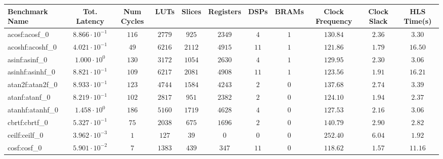 \begin{tabular}{|l|c|c|c|c|c|c|c|c|c|c|}
\hline
Benchmark Name               & Tot. Latency            & Num Cycles & LUTs       & Slices    & Registers & DSPs    & BRAMs & Clock Frequency & Clock Slack & HLS Time(s) \\
\hline
acosf:acosf\_0               & $ 8.866 \cdot 10^{-1} $ & $ 116    $ & $ 2779   $ & $ 925   $ & $ 2349  $ & $ 4   $ & $ 1 $ & $ 130.84      $ & $ 2.36    $ & $ 3.30    $ \\
acoshf:acoshf\_0             & $ 4.021 \cdot 10^{-1} $ & $ 49     $ & $ 6216   $ & $ 2112  $ & $ 4915  $ & $ 11  $ & $ 1 $ & $ 121.86      $ & $ 1.79    $ & $ 16.50   $ \\
asinf:asinf\_0               & $ 1.000 \cdot 10^{0}  $ & $ 130    $ & $ 3172   $ & $ 1054  $ & $ 2630  $ & $ 4   $ & $ 1 $ & $ 129.95      $ & $ 2.30    $ & $ 3.06    $ \\
asinhf:asinhf\_0             & $ 8.821 \cdot 10^{-1} $ & $ 109    $ & $ 6217   $ & $ 2081  $ & $ 4908  $ & $ 11  $ & $ 1 $ & $ 123.56      $ & $ 1.91    $ & $ 16.21   $ \\
atan2f:atan2f\_0             & $ 8.933 \cdot 10^{-1} $ & $ 123    $ & $ 4744   $ & $ 1584  $ & $ 4243  $ & $ 2   $ & $ 0 $ & $ 137.68      $ & $ 2.74    $ & $ 3.39    $ \\
atanf:atanf\_0               & $ 8.219 \cdot 10^{-1} $ & $ 102    $ & $ 2817   $ & $ 951   $ & $ 2382  $ & $ 2   $ & $ 0 $ & $ 124.10      $ & $ 1.94    $ & $ 2.37    $ \\
atanhf:atanhf\_0             & $ 1.458 \cdot 10^{0}  $ & $ 186    $ & $ 5160   $ & $ 1719  $ & $ 4628  $ & $ 4   $ & $ 0 $ & $ 127.53      $ & $ 2.16    $ & $ 3.06    $ \\
cbrtf:cbrtf\_0               & $ 5.327 \cdot 10^{-1} $ & $ 75     $ & $ 2038   $ & $ 675   $ & $ 1696  $ & $ 2   $ & $ 0 $ & $ 140.79      $ & $ 2.90    $ & $ 2.82    $ \\
ceilf:ceilf\_0               & $ 3.962 \cdot 10^{-3} $ & $ 1      $ & $ 127    $ & $ 39    $ & $ 0     $ & $ 0   $ & $ 0 $ & $ 252.40      $ & $ 6.04    $ & $ 1.92    $ \\
cosf:cosf\_0                 & $ 5.901 \cdot 10^{-2} $ & $ 7      $ & $ 1383   $ & $ 439   $ & $ 347   $ & $ 11  $ & $ 0 $ & $ 118.62      $ & $ 1.57    $ & $ 11.16   $ \\

\end{tabular}
